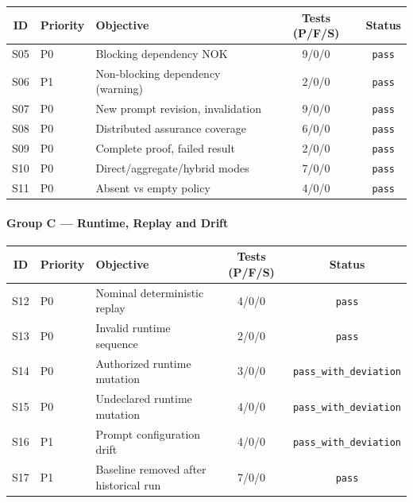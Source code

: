 \documentclass[10pt]{article}
\newcommand{\statuspass}{\textcolor{passgreen}{\texttt{pass}}}
\newcommand{\statusdeviation}{\textcolor{deviationorange}{\texttt{pass\_with\_deviation}}}
\begin{document}
\begin{table}[htbp]
	\centering
	\small
	\begin{tabular}{@{}clp{6.5cm}cc@{}}
		\toprule
		\textbf{ID} & \textbf{Priority} & \textbf{Objective} & \textbf{Tests (P/F/S)} & \textbf{Status} \\
		\midrule
		S05 & P0 & Blocking dependency NOK & 9/0/0 & \statuspass{} \\
		S06 & P1 & Non-blocking dependency (warning) & 2/0/0 & \statuspass{} \\
		S07 & P0 & New prompt revision, invalidation & 9/0/0 & \statuspass{} \\
		S08 & P0 & Distributed assurance coverage & 6/0/0 & \statuspass{} \\
		S09 & P0 & Complete proof, failed result & 2/0/0 & \statuspass{} \\
		S10 & P0 & Direct/aggregate/hybrid modes & 7/0/0 & \statuspass{} \\
		S11 & P0 & Absent vs empty policy & 4/0/0 & \statuspass{} \\
		\bottomrule
	\end{tabular}
\end{table}

\paragraph{Group C --- Runtime, Replay and Drift}

\begin{table}[htbp]
	\centering
	\small
	\begin{tabular}{@{}clp{6.5cm}cc@{}}
		\toprule
		\textbf{ID} & \textbf{Priority} & \textbf{Objective} & \textbf{Tests (P/F/S)} & \textbf{Status} \\
		\midrule
		S12 & P0 & Nominal deterministic replay & 4/0/0 & \statuspass{} \\
		S13 & P0 & Invalid runtime sequence & 2/0/0 & \statuspass{} \\
		S14 & P0 & Authorized runtime mutation & 3/0/0 & \statusdeviation{} \\
		S15 & P0 & Undeclared runtime mutation & 4/0/0 & \statusdeviation{} \\
		S16 & P1 & Prompt configuration drift & 4/0/0 & \statusdeviation{} \\
		S17 & P1 & Baseline removed after historical run & 7/0/0 & \statuspass{} \\
		\bottomrule
	\end{tabular}
\end{table}
\end{document}
